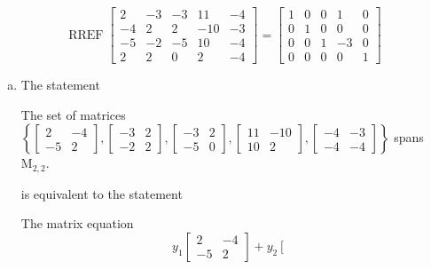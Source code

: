 \begin{exerciseAnswer} 


\[\operatorname{RREF} \left[\begin{array}{ccccc}
2 & -3 & -3 & 11 & -4 \\
-4 & 2 & 2 & -10 & -3 \\
-5 & -2 & -5 & 10 & -4 \\
2 & 2 & 0 & 2 & -4
\end{array}\right] = \left[\begin{array}{ccccc}
1 & 0 & 0 & 1 & 0 \\
0 & 1 & 0 & 0 & 0 \\
0 & 0 & 1 & -3 & 0 \\
0 & 0 & 0 & 0 & 1
\end{array}\right] \]


\begin{enumerate}[(a)]
\item The statement 
\begin{center}\begin{minipage}{0.8\textwidth}
 The set of matrices \( \left\{ \left[\begin{array}{cc}
2 & -4 \\
-5 & 2
\end{array}\right] , \left[\begin{array}{cc}
-3 & 2 \\
-2 & 2
\end{array}\right] , \left[\begin{array}{cc}
-3 & 2 \\
-5 & 0
\end{array}\right] , \left[\begin{array}{cc}
11 & -10 \\
10 & 2
\end{array}\right] , \left[\begin{array}{cc}
-4 & -3 \\
-4 & -4
\end{array}\right] \right\} \) spans \(\mathrm{M}_{2,2}\). 
\end{minipage}\end{center}
     is equivalent to the statement 
\begin{center}\begin{minipage}{0.8\textwidth}
 The matrix equation \[ y_{1} \left[\begin{array}{cc}
2 & -4 \\
-5 & 2
\end{array}\right] + y_{2} \left[\begin{array}{cc}

\end{array}\]
\end{minipage}
\end{center}
\end{enumerate}
\end{exerciseAnswer}
